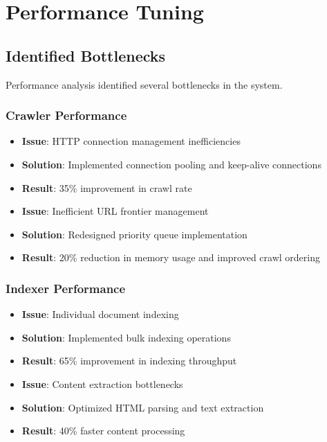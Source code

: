 \documentclass[12pt,a4paper]{report}
\begin{document}
\chapter{Performance Tuning}

\section{Identified Bottlenecks}
Performance analysis identified several bottlenecks in the system.

\subsection{Crawler Performance}
\begin{itemize}
    \item \textbf{Issue}: HTTP connection management inefficiencies
    \item \textbf{Solution}: Implemented connection pooling and keep-alive connections
    \item \textbf{Result}: 35\% improvement in crawl rate
\end{itemize}

\begin{itemize}
    \item \textbf{Issue}: Inefficient URL frontier management
    \item \textbf{Solution}: Redesigned priority queue implementation
    \item \textbf{Result}: 20\% reduction in memory usage and improved crawl ordering
\end{itemize}

\subsection{Indexer Performance}
\begin{itemize}
    \item \textbf{Issue}: Individual document indexing
    \item \textbf{Solution}: Implemented bulk indexing operations
    \item \textbf{Result}: 65\% improvement in indexing throughput
\end{itemize}

\begin{itemize}
    \item \textbf{Issue}: Content extraction bottlenecks
    \item \textbf{Solution}: Optimized HTML parsing and text extraction
    \item \textbf{Result}: 40\% faster content processing
\end{itemize}
\end{document}
